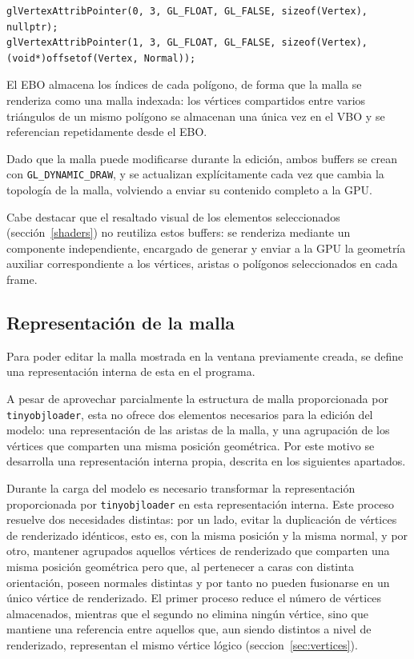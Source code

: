 \begin{listing}[htb]
\begin{verbatim}
glVertexAttribPointer(0, 3, GL_FLOAT, GL_FALSE, sizeof(Vertex), nullptr);
glVertexAttribPointer(1, 3, GL_FLOAT, GL_FALSE, sizeof(Vertex), (void*)offsetof(Vertex, Normal));
\end{verbatim}
\caption{Configuración de atributos en el VAO.}
\label{lst:config_atrib_VAO}
\end{listing}

El EBO almacena los índices de cada polígono, de forma que la malla se renderiza como una malla indexada: los vértices compartidos entre varios triángulos de un mismo polígono se almacenan una única vez en el VBO y se referencian repetidamente desde el EBO.

Dado que la malla puede modificarse durante la edición, ambos buffers se crean con \texttt{GL\_DYNAMIC\_DRAW}, y se actualizan explícitamente cada vez que cambia la topología de la malla, volviendo a enviar su contenido completo a la GPU.

Cabe destacar que el resaltado visual de los elementos seleccionados (sección~\ref{shaders}) no reutiliza estos buffers: se renderiza mediante un componente independiente, encargado de generar y enviar a la GPU la geometría auxiliar correspondiente a los vértices, aristas o polígonos seleccionados en cada frame.

\subsection{Representación de la malla} \label{sec:mesh}

Para poder editar la malla mostrada en la ventana previamente creada, se define una representación interna de esta en el programa.

A pesar de aprovechar parcialmente la estructura de malla proporcionada por \texttt{tinyobjloader}, esta no ofrece dos elementos necesarios para la edición del modelo: una representación de las aristas de la malla, y una agrupación de los vértices que comparten una misma posición geométrica. Por este motivo se desarrolla una representación interna propia, descrita en los siguientes apartados.

Durante la carga del modelo es necesario transformar la representación proporcionada por \texttt{tinyobjloader} en esta representación interna. Este proceso resuelve dos necesidades distintas: por un lado, evitar la duplicación de vértices de renderizado idénticos, esto es, con la misma posición y la misma normal, y por otro, mantener agrupados aquellos vértices de renderizado que comparten una misma posición geométrica pero que, al pertenecer a caras con distinta orientación, poseen normales distintas y por tanto no pueden fusionarse en un único vértice de renderizado. El primer proceso reduce el número de vértices almacenados, mientras que el segundo no elimina ningún vértice, sino que mantiene una referencia entre aquellos que, aun siendo distintos a nivel de renderizado, representan el mismo vértice lógico (seccion~\ref{sec:vertices}).

